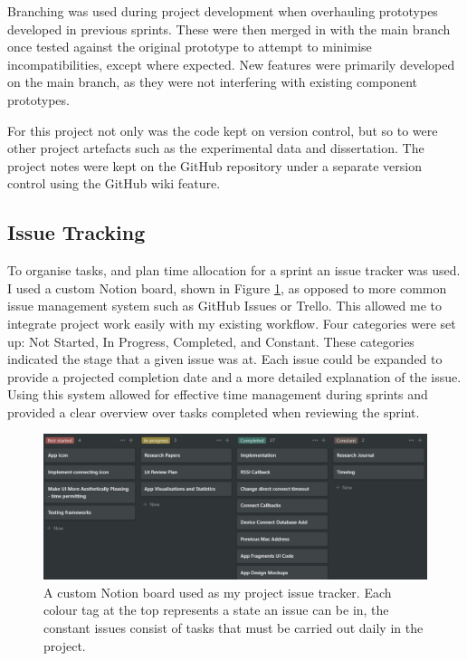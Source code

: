 \documentclass{l4proj}
\begin{document}
Branching was used during project development when overhauling prototypes developed in previous sprints. These were then merged in with the main branch once tested against the original prototype to attempt to minimise incompatibilities, except where expected. New features were primarily developed on the main branch, as they were not interfering with existing component prototypes.

For this project not only was the code kept on version control, but so to were other project artefacts such as the experimental data and dissertation. The project notes were kept on the GitHub repository under a separate version control using the GitHub wiki feature.

\subsection{Issue Tracking}

To organise tasks, and plan time allocation for a sprint an issue tracker was used. I used a custom Notion board, shown in Figure \ref{fig:issue_tracker}, as opposed to more common issue management system such as GitHub Issues or Trello. This allowed me to integrate project work easily with my existing workflow. Four categories were set up: Not Started, In Progress, Completed, and Constant. These categories indicated the stage that a given issue was at. Each issue could be expanded to provide a projected completion date and a more detailed explanation of the issue. Using this system allowed for effective time management during sprints and provided a clear overview over tasks completed when reviewing the sprint.

\begin{figure}[!htb]
    \centering
    \includegraphics[width=1.0\linewidth]{images/issue_tracker.png}

    \caption{ A custom Notion board used as my project issue tracker. Each colour tag at the top represents a state an issue can be in, the constant issues consist of tasks that must be carried out daily in the project. }

    \label{fig:issue_tracker}
\end{figure}
\end{document}
